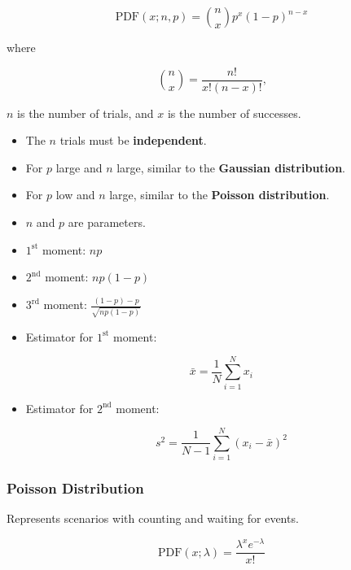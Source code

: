 \begin{equation*}
    \text{PDF}(x; n, p) = \binom{n}{x} p^x (1-p)^{n-x}
\end{equation*}

where

\begin{equation*}
    \binom{n}{x} = \frac{n!}{x!(n-x)!}\text{,}
\end{equation*}

$n$ is the number of trials, and $x$ is the number of successes.

\begin{itemize}
    \item The $n$ trials must be \textbf{independent}.
    \item For $p$ large and $n$ large, similar to the \textbf{Gaussian distribution}.
    \item For $p$ low and $n$ large, similar to the \textbf{Poisson distribution}.
    \item $n$ and $p$ are parameters.
    \item $1^\text{st}$ moment: $np$
    \item $2^\text{nd}$ moment: $np(1-p)$
    \item $3^\text{rd}$ moment: $\frac{(1-p)-p}{\sqrt{np(1-p)}}$
    \item Estimator for $1^\text{st}$ moment:

          \begin{equation*}
              \bar{x} = \frac{1}{N} \sum_{i=1}^{N} x_i
          \end{equation*}
    \item Estimator for $2^\text{nd}$ moment:

          \begin{equation*}
              s^2 = \frac{1}{N-1} \sum_{i=1}^{N} (x_i - \bar{x})^2
          \end{equation*}
\end{itemize}

\subsubsection{Poisson Distribution}

Represents scenarios with counting and waiting for events.

\begin{equation*}
    \text{PDF}(x; \lambda) = \frac{\lambda^x e^{-\lambda}}{x!}
\end{equation*}

